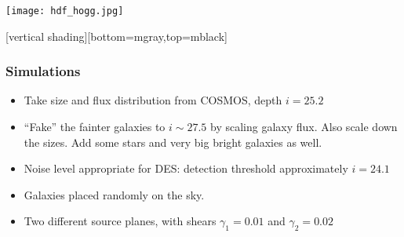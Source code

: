 \documentclass{beamer}
\begin{document}
{

    \frame
    {
     
        \begin{center}
            \texttt{[image: hdf\_hogg.jpg]}
            \newline
        \end{center}

    }
    [vertical shading][bottom=mgray,top=mblack]

}


\frame
{
    \frametitle{Simulations}

 
    \begin{itemize}


        \item Take size and flux distribution from {\color{brightred}COSMOS}, depth {\color{gold} $i=25.2$}

        \item ``Fake'' the fainter galaxies to {\color{gold}$i \sim 27.5$} by
            scaling galaxy flux.  Also scale down the sizes.   Add some stars and very
            big bright galaxies as well.

        \item Noise level appropriate for DES: detection threshold approximately
            {\color{lightskyblue} $i=24.1$}

        \item Galaxies placed randomly on the sky.

        \item Two different source planes, with shears {\color{gold}$\gamma_1 = 0.01$}
            and {\color{gold} $\gamma_2 = 0.02$}


    \end{itemize}

}
\end{document}
